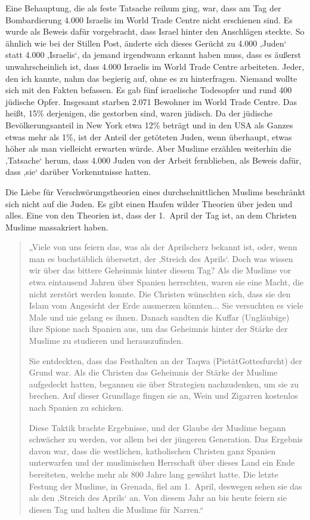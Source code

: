 \documentclass[12pt]{memoir}
\begin{document}
Eine Behauptung, die als feste Tatsache reihum ging, war,
dass am Tag der Bombardierung 4.000 Israelis
im World Trade Centre nicht erschienen sind.
Es wurde als Beweis dafür vorgebracht,
dass Israel hinter den Anschlägen steckte.
So ähnlich wie bei der Stillen Post,
änderte sich dieses Gerücht zu 4.000 ‚Juden‘ statt 4.000 ‚Israelis‘,
da jemand irgendwann erkannt haben muss,
dass es äußerst unwahrscheinlich ist,
dass 4.000 Israelis im World Trade Centre arbeiteten.
Jeder, den ich kannte, nahm das begierig auf, ohne es zu hinterfragen.
Niemand wollte sich mit den Fakten befassen.
Es gab fünf israelische Todesopfer und rund 400 jüdische Opfer.
Insgesamt starben 2.071 Bewohner im World Trade Centre.
Das heißt, 15\% derjenigen, die gestorben sind, waren jüdisch.
Da der jüdische Bevölkerungsanteil in New York etwa 12\% beträgt
und in den USA als Ganzes etwas mehr als 1\%,
ist der Anteil der getöteten Juden, wenn überhaupt,
etwas höher als man vielleicht erwarten würde.
Aber Muslime erzählen weiterhin die ‚Tatsache‘ herum,
dass 4.000 Juden von der Arbeit fernblieben,
als Beweis dafür, dass ‚sie‘ darüber Vorkenntnisse hatten.

Die Liebe für Verschwörungstheorien eines durchschnittlichen Muslims
beschränkt sich nicht auf die Juden.
Es gibt einen Haufen wilder Theorien über jeden und alles.
Eine von den Theorien ist, dass der 1.\ April der Tag ist,
an dem Christen Muslime massakriert haben.

\begin{quote}
„Viele von uns feiern das, was als der Aprilscherz bekannt ist, oder,
wenn man es buchstäblich übersetzt, der ‚Streich des Aprils‘.
Doch was wissen wir über das bittere Geheimnis hinter diesem Tag?
Als die Muslime vor etwa eintausend Jahren über Spanien herrschten,
waren sie eine Macht, die nicht zerstört werden konnte.
Die Christen wünschten sich, dass sie den Islam
vom Angesicht der Erde ausmerzen könnten...
Sie versuchten es viele Male und nie gelang es ihnen.
Danach sandten die Kuffar (Ungläubige) ihre Spione nach Spanien aus,
um das Geheimnis hinter der Stärke der Muslime zu studieren und herauszufinden.

Sie entdeckten, dass das Festhalten an der Taqwa
(Pietät\/Gottesfurcht) der Grund war.
Als die Christen das Geheimnis der Stärke der Muslime aufgedeckt hatten,
begannen sie über Strategien nachzudenken, um sie zu brechen.
Auf dieser Grundlage fingen sie an,
Wein und Zigarren kostenlos nach Spanien zu schicken.

Diese Taktik brachte Ergebnisse,
und der Glaube der Muslime begann schwächer zu werden,
vor allem bei der jüngeren Generation.
Das Ergebnis davon war, dass die westlichen, katholischen Christen
ganz Spanien unterwarfen und der muslimischen Herrschaft
über dieses Land ein Ende bereiteten,
welche mehr als 800 Jahre lang gewährt hatte.
Die letzte Festung der Muslime, in Grenada, fiel am 1.\ April,
deswegen sehen sie das als den ‚Streich des Aprils‘ an.
Von diesem Jahr an bis heute feiern sie diesen Tag
und halten die Muslime für Narren.“
\end{quote}
\end{document}
